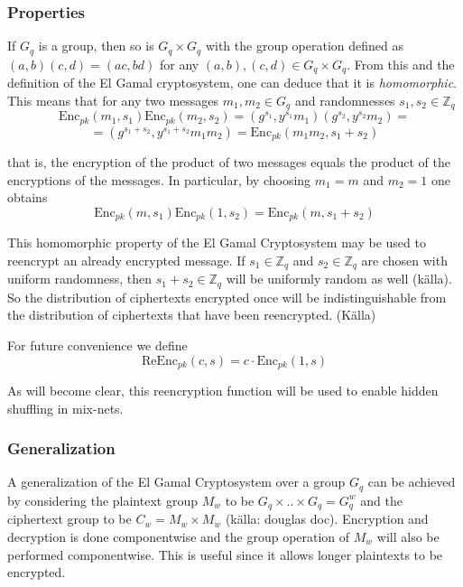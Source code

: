\subsubsection{Properties}
If $G_q$ is a group, then so is $G_q \times G_q$ with the group
operation defined as $(a,b)(c,d) = (a c, b d)$ for any $(a,b),(c,d)
\in G_q \times G_q$. From this and the definition of the El Gamal
cryptosystem, one can deduce that it is \emph{homomorphic}. This means that
for any two messages $m_1, m_2 \in G_q$ and randomnesses $s_1, s_2 \in
\mathbb{Z}_q$
$$
 \mathrm{Enc}_{pk}(m_1, s_1)\mathrm{Enc}_{pk}(m_2, s_2) =
(g^{s_1}, y^{s_1}m_1)(g^{s_2},y^{s_2}m_2) =
$$
$$
= (g^{s_1 + s_2}, y^{s_1 + s_2}m_1m_2) = \mathrm{Enc}_{pk}(m_1m_2, s_1 + s_2)
$$

that is, the encryption of the product of two messages equals the
product of the encryptions of the messages. In particular, by choosing
$m_1 = m$ and $m_2 = 1$ one obtains
$$
\mathrm{Enc}_{pk}(m, s_1) \mathrm{Enc}_{pk}(1, s_2) = \mathrm{Enc}_{pk}(m, s_1 + s_2)
$$

This homomorphic property of the El Gamal Cryptosystem may be used to
reencrypt an already encrypted message. If $s_1 \in \mathbb{Z}_q$ and
$s_2 \in \mathbb{Z}_q$ are chosen with uniform randomness, then $s_1 +
s_2 \in \mathbb{Z}_q$ will be uniformly random as well (källa). So the
distribution of ciphertexts encrypted once will be indistinguishable
from the distribution of ciphertexts that have been
reencrypted. (Källa)

For future convenience we define
$$
\mathrm{ReEnc}_{pk}(c,s) = c \cdot \mathrm{Enc}_{pk}(1,s) 
$$

As will become clear, this reencryption function will be used to
enable hidden shuffling in mix-nets.

\subsubsection{Generalization}
A generalization of the El Gamal Cryptosystem over a group $G_q$ can
be achieved by considering the plaintext group $M_w$ to be $G_q \times
.. \times G_q = G_q^w$ and the ciphertext group to be $C_w = M_w
\times M_w$ (källa: douglas doc). Encryption and decryption is done
componentwise and the group operation of $M_w$ will also be performed
componentwise. This is useful since it allows longer plaintexts to be
encrypted.
